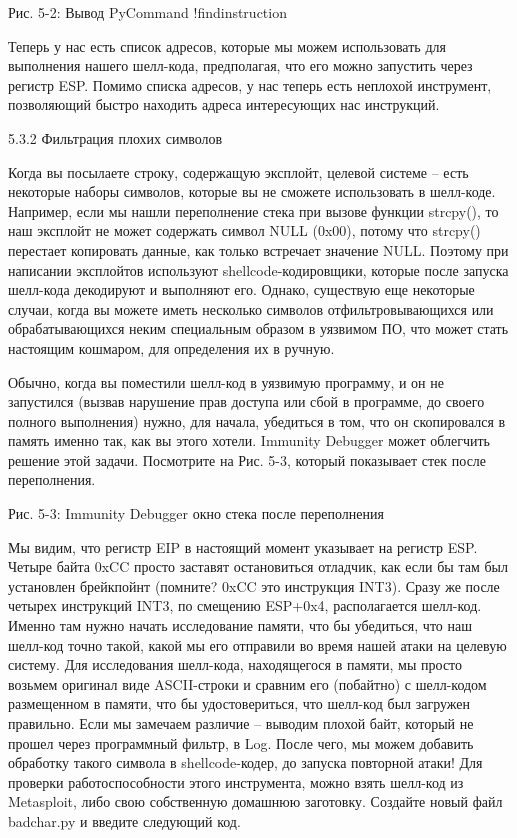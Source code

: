 \documentclass[12pt]{book}
\begin{document}
 
Рис. 5-2: Вывод PyCommand !findinstruction

Теперь у нас есть список адресов, которые мы можем использовать для выполнения нашего шелл-кода, предполагая, что его можно запустить через регистр ESP. Помимо списка адресов, у нас теперь есть неплохой инструмент, позволяющий быстро находить адреса интересующих нас инструкций.

5.3.2 Фильтрация плохих символов

Когда вы посылаете строку, содержащую эксплойт, целевой системе – есть некоторые наборы символов, которые вы не сможете использовать в шелл-коде. Например, если мы нашли переполнение стека при вызове функции strcpy(), то наш эксплойт не может содержать символ NULL (0x00), потому что strcpy() перестает копировать данные, как только встречает значение NULL. Поэтому при написании эксплойтов используют shellcode-кодировщики, которые после запуска шелл-кода декодируют и выполняют его. Однако, существую еще некоторые случаи, когда вы можете иметь несколько символов отфильтровывающихся или обрабатывающихся неким специальным образом в уязвимом ПО, что может стать настоящим кошмаром, для определения их в ручную.

Обычно, когда вы поместили шелл-код в уязвимую программу, и он не запустился (вызвав нарушение прав доступа или сбой в программе, до своего полного выполнения) нужно, для начала, убедиться в том, что он скопировался в память именно так, как вы этого хотели. Immunity Debugger может облегчить решение этой задачи. Посмотрите на Рис. 5-3, который показывает стек после переполнения.


Рис. 5-3: Immunity Debugger окно стека после переполнения

Мы видим, что регистр EIP в настоящий момент указывает на регистр ESP. Четыре байта 0xCC просто заставят остановиться отладчик, как если бы там был установлен брейкпойнт (помните? 0xCC это инструкция INT3). Сразу же после четырех инструкций INT3, по смещению ESP+0x4, располагается шелл-код. Именно там нужно начать исследование памяти, что бы убедиться, что наш шелл-код точно такой, какой мы его отправили во время нашей атаки на целевую систему. Для исследования шелл-кода, находящегося в памяти, мы просто возьмем оригинал виде ASCII-строки и сравним его (побайтно) с шелл-кодом размещенном в памяти, что бы удостовериться, что шелл-код был загружен правильно. Если мы замечаем различие – выводим плохой байт, который не прошел через программный фильтр, в Log. После чего, мы можем добавить обработку такого символа в shellcode-кодер, до запуска повторной атаки! Для проверки работоспособности этого инструмента, можно взять шелл-код из Metasploit, либо свою собственную домашнюю заготовку. Создайте новый файл badchar.py и введите следующий код.
\end{document}
